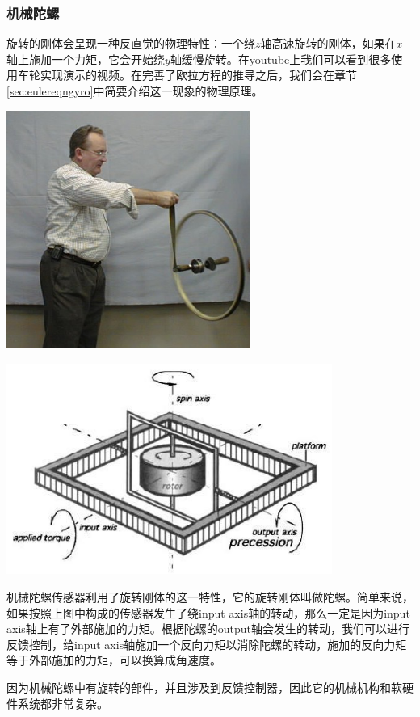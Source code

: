 \documentclass[11pt]{article}
\begin{document}
\subsubsection{机械陀螺}
旋转的刚体会呈现一种反直觉的物理特性：一个绕$z$轴高速旋转的刚体，如果在$x$轴上施加一个力矩，它会开始绕$y$轴缓慢旋转。在youtube上我们可以看到很多使用车轮实现演示的视频。在完善了欧拉方程的推导之后，我们会在章节\ref{sec:eulereqngyro}中简要介绍这一现象的物理原理。

\begin{center}
\includegraphics[width=0.6\textwidth]{images/BicycleWheelGyro.jpg}
\end{center}

\includegraphics[width=0.8\textwidth]{images/gyroscopeAxes.jpg}

机械陀螺传感器利用了旋转刚体的这一特性，它的旋转刚体叫做陀螺。简单来说，如果按照上图中构成的传感器发生了绕input axis轴的转动，那么一定是因为input axis轴上有了外部施加的力矩。根据陀螺的output轴会发生的转动，我们可以进行反馈控制，给input axis轴施加一个反向力矩以消除陀螺的转动，施加的反向力矩等于外部施加的力矩，可以换算成角速度。

因为机械陀螺中有旋转的部件，并且涉及到反馈控制器，因此它的机械机构和软硬件系统都非常复杂。
\end{document}
